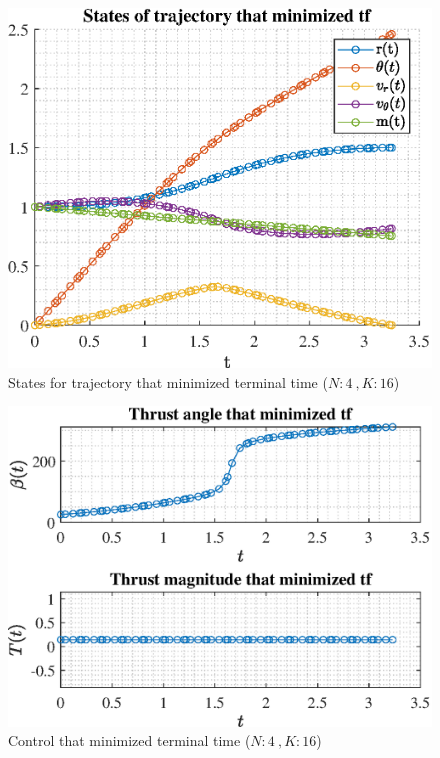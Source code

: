 \documentclass[]{article}
\begin{document}
	\begin{figure}
		\centering
		\includegraphics[scale=0.75]{states_N4_K16_C3_tf.eps}
		\caption{States for trajectory that minimized terminal time (\(N:4\ , K:16\))}
		\label{fig:states_N4_K16_C3_tf}
	\end{figure}
	\begin{figure}
		\centering
		\includegraphics[scale=0.75]{control_N4_K16_C3_tf.eps}
		\caption{Control that minimized terminal time (\(N:4\ , K:16\))}
		\label{fig:control_N4_K16_C3_tf}
	\end{figure}
\end{document}
